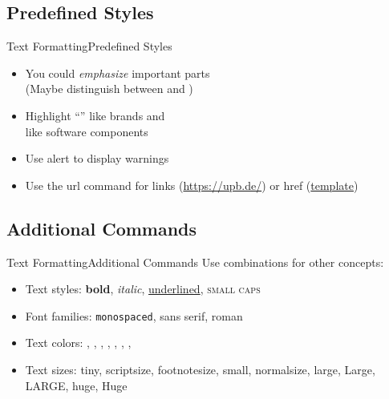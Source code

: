 \documentclass{beamer}
\begin{document}
\subsection{Predefined Styles}
\begin{frame}{Text Formatting}{Predefined Styles}
	\begin{itemize}
		\item You could \emph{emphasize} important parts \\(Maybe distinguish between  and )
		\item Highlight ``'' like brands and\\  like software components
		\item Use alert to display \alert{warnings}
		\item Use the url command for links (\url{https://upb.de/}) or href (\href{https://github.com/adibaba/templates}{template})
	\end{itemize}
\end{frame}

\subsection{Additional Commands}
\begin{frame}{Text Formatting}{Additional Commands}
	Use combinations for other concepts:
	\begin{itemize}
		\item Text styles: \textbf{bold}, \textit{italic}, \underline{underlined}, \textsc{small caps}
		\item Font families: \texttt{monospaced}, \textsf{sans serif}, \textrm{roman}
		\item Text colors: , , , , , , , 
		\item Text sizes: {\tiny tiny}, {\scriptsize scriptsize}, {\footnotesize footnotesize}, {\small small}, {\normalsize normalsize}, {\large large}, {\Large Large}, {\LARGE LARGE}, {\huge huge}, {\Huge Huge}
	\end{itemize}
\end{frame}
\end{document}
